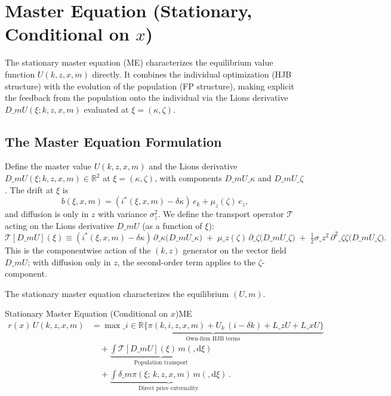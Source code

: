 \documentclass[11pt,letterpaper,oneside]{article}
\numberwithin{equation}{section}
\newcommand{\R}{\mathbb{R}}
\newcommand{\1}{\mathbf{1}}
\newcommand{\diff}{,\mathrm{d}}
\newcommand{\Lz}{L\_z}
\newcommand{\Lx}{L\_x}
\newcommand{\dmU}{D\_m U}
\newcommand{\Dm}{D\_m}
\begin{document}
\section[Master Equation (Stationary, Conditional on x)]{Master Equation (Stationary, Conditional on $x$)}\label{sec:master-equation}
The stationary master equation (ME) characterizes the equilibrium value function $U(k,z,x,m)$ directly. It combines the individual optimization (HJB structure) with the evolution of the population (FP structure), making explicit the feedback from the population onto the individual via the Lions derivative $\dmU(\xi;k,z,x,m)$ evaluated at $\xi=(\kappa,\zeta)$.

\subsection{The Master Equation Formulation}\label{sec:me-formulation}

Define the master value $U(k,z,x,m)$ and the Lions derivative $\dmU(\xi;k,z,x,m)\in\R^2$ at $\xi=(\kappa,\zeta)$, with components $\dmU\_\kappa$ and $\dmU\_\zeta$. The drift at $\xi$ is
\[
b(\xi,x,m)=(i^*(\xi,x,m)-\delta\kappa)\,e_k+\mu_z(\zeta)\,e_z,
\]
and diffusion is only in $z$ with variance $\sigma_z^2$. We define the transport operator $\mathcal{T}$ acting on the Lions derivative $\dmU$ (as a function of $\xi$):
\[
\mathcal{T}[\dmU](\xi) \equiv (i^*(\xi,x,m)-\delta\kappa)\,\partial\_\kappa\big(\dmU\_\kappa\big)
\; +\; \mu\_z(\zeta)\,\partial\_\zeta\big(\dmU\_\zeta\big)
\; +\; \tfrac12\sigma\_z^2\,\partial^2\_{\zeta\zeta}\big(\dmU\_\zeta\big).
\]
This is the componentwise action of the $(k,z)$ generator on the vector field $\Dm U$; with diffusion only in $z$, the second-order term applies to the $\zeta$-component.

The stationary master equation characterizes the equilibrium $(U,m)$.

\begin{theorem}{Stationary Master Equation (Conditional on $x$)}{ME}
\begin{equation}
\boxed{\begin{aligned}
r(x)\,U(k,z,x,m) &= \underbrace{\max\_{i\in\R}\big\{\pi(k,i,z,x,m) + U_k\,(i-\delta k) + \Lz U + \Lx U\big\}}_{\text{Own-firm HJB terms}} \\
&\quad + \underbrace{\int \mathcal{T}[\dmU](\xi)\, m(\diff \xi)}_{\text{Population transport}} \\
&\quad + \underbrace{\int \delta\_m \pi(\xi;\,k,z,x,m)\, m(\diff \xi)}_{\text{Direct price externality}}\,.
\end{aligned}}
\tag{ME}\label{eq:ME}
\end{equation}
\end{theorem}
\end{document}
